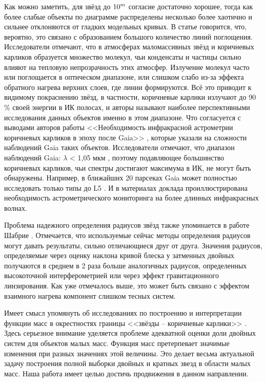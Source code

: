 Как можно заметить, для звёзд до \(\textup{10}^m\) согласие достаточно хорошее, тогда как более слабые объекты по диаграмме распределены несколько более хаотично и сильнее отклоняются от гладких модельных кривых. В статье говорится, что, вероятно, это связано с образованием большого количество линий поглощения. Исследователи отмечают, что в атмосферах маломассивных звёзд и коричневых карликов образуется множество молекул, чьи конденсаты и частицы сильно влияют на тепловую непрозрачность этих атмосфер. Излучение молекул часто или поглощается в оптическом диапазоне, или слишком слабо из-за эффекта обратного нагрева верхних слоев, где линии формируются. Всё это приводит к видимому покраснению звёзд, в частности, коричневые карлики излучают до 90\,\% своей энергии в ИК полосах, и авторы называют наиболее перспективными исследования данных объектов именно в этом диапазоне. Что согласуется с выводами авторов работы <<Необходимость инфракрасной астрометрии коричневых карликов в эпоху после Gaia>> \cite{2019BAAS...51c.105K}, которые указали на сложности наблюдений Gaia таких объектов. Исследователи отмечают, что диапазон наблюдений Gaia: $\lambda$ < 1,05 мкм \cite{2016A&A...595A...1G}, поэтому подавляющее большинство коричневых карликов, чьи спектры достигают максимума в ИК, не могут быть обнаружены. Например, в ближайших 20 парсеках Gaia может полностью исследовать только типы до L5 \cite{2019ApJS..240...19K}. И в материалах доклада проиллюстрирована необходимость астрометрического мониторинга на более длинных инфракрасных волнах.

Проблема надежного определения радиусов звёзд также упоминается в работе Шабрие \cite{2005astro.ph..9798C}. Отмечается, что используемые сейчас методы определения радиусов могут давать результаты, сильно отличающиеся друг от друга. Значения радиусов, определяемые через оценку наклона кривой блеска у затменных двойных получаются в среднем в 2 раза больше аналогичных радиусов, определенных высокоточной интерферометрией или через эффект гравитационного линзирования. Как уже отмечалось выше, это может быть связано с эффектом взаимного нагрева компонент слишком тесных систем.

Имеет смысл упомянуть об исследованиях по построению и интерпретации функции масс в окрестностях границы <<звёзды -- коричневые карлики>> \cite{2015ApJ...800...72T}. Здесь серьезное внимание уделяется проблеме адекватной оценки доли двойных систем для объектов малых масс. Функция масс претерпевает значимые изменения при разных значениях этой величины.  Это делает весьма актуальной задачу построения полной выборки двойных и кратных звезд в области малых масс. Наша работа имеет целью достичь продвижения в данном направлении.

